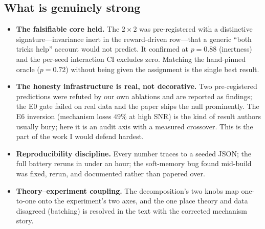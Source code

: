 \documentclass[11pt]{article}
\begin{document}
\subsection{What is genuinely strong}
\begin{itemize}
  \item \textbf{The falsifiable core held.} The $2{\times}2$ was pre-registered with a
  distinctive signature---invariance inert in the reward-driven row---that a generic
  ``both tricks help'' account would not predict. It confirmed at $p{=}0.88$ (inertness)
  and the per-seed interaction CI excludes zero. Matching the hand-pinned oracle
  ($p{=}0.72$) without being given the assignment is the single best result.
  \item \textbf{The honesty infrastructure is real, not decorative.} Two pre-registered
  predictions were refuted by our own ablations and are reported as findings; the E0
  gate failed on real data and the paper ships the null prominently. The E6 inversion
  (mechanism loses $49\%$ at high SNR) is the kind of result authors usually bury;
  here it is an audit axis with a measured crossover. This is the part of the work I
  would defend hardest.
  \item \textbf{Reproducibility discipline.} Every number traces to a seeded JSON; the
  full battery reruns in under an hour; the soft-memory bug found mid-build was fixed,
  rerun, and documented rather than papered over.
  \item \textbf{Theory--experiment coupling.} The decomposition's two knobs map
  one-to-one onto the experiment's two axes, and the one place theory and data
  disagreed (batching) is resolved in the text with the corrected mechanism story.
\end{itemize}
\end{document}
